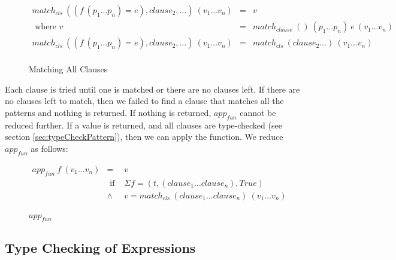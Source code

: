 \documentclass[acmsmall]{acmart}
\begin{document}
\begin{figure}[H]
  \begin{equation*}
    \begin{aligned}
      match_{cls} \: ((f \: (p_1 \dots p_n) = e), clause_2, \dots) \: (v_1 \dots v_n) & = & v                                                               \\
      \textrm{ where } v                                                              & = & match_{clause} \: () \: (p_1 \dots p_n) \: e \: (v_1 \dots v_n) \\
      match_{cls} \: ((f \: (p_1 \dots p_n) = e), clause_2, \dots) \: (v_1 \dots v_n) & = & match_{cls} \: (clause_2 \dots) \: (v_1 \dots v_n)              \\
    \end{aligned}
  \end{equation*}
  \caption{Matching All Clauses}
\end{figure}

Each clause is tried until one is matched or there are no clauses left. If there are no clauses left to match, then we failed to find a clause that matches all the patterns and nothing is returned. If nothing is returned, $app_{fun}$ cannot be reduced further. If a value is returned, and all clauses are type-checked (see section \ref{sec:typeCheckPattern}), then we can apply the function. We reduce $app_{fun}$ as follows:

\begin{figure}[H]
  \begin{equation*}
    \begin{aligned}
      app_{fun} \: f \: (v_1 \dots v_n) & =             & v                                                               \\
                                        & \textrm{ if } & \Sigma f = (t, (clause_1 \dots clause_n), True)                 \\
                                        & \land         & v = match_{cls} \: (clause_1 \dots clause_n) \: (v_1 \dots v_n) \\
    \end{aligned}
  \end{equation*}
  \caption{$app_{fun}$}
\end{figure}

\subsection{Type Checking of Expressions}
\end{document}
